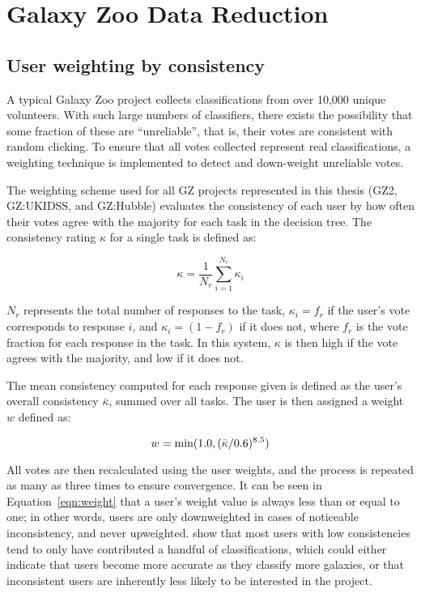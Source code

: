 \section{Galaxy Zoo Data Reduction}
\subsection{User weighting by consistency}
A typical Galaxy Zoo project collects classifications from over 10,000 unique volunteers. With such large numbers of classifiers, there exists the possibility that some fraction of these are ``unreliable'', that is, their votes are consistent with random clicking. To ensure that all votes collected represent real classifications, a weighting technique is implemented to detect and down-weight unreliable votes.

The weighting scheme used for all GZ projects represented in this thesis (GZ2, GZ:UKIDSS, and GZ:Hubble) evaluates the consistency of each user by how often their votes agree with the majority for each task in the decision tree. The consistency rating $\kappa$ for a single task is defined as:

\begin{equation}
\kappa = \frac{1}{N_{r}}\sum_{i=1}^{N_{r}}{\kappa_{i}}
\label{eqn:kappa}
\end{equation}

\noindent $N_{r}$ represents the total number of responses to the task, $\kappa_{i} = f_{r}$ if the user's vote corresponds to response $i$, and $\kappa_{i} = (1-f_{r})$ if it does not, where $f_{r}$ is the vote fraction for each response in the task. In this system, $\kappa$ is then high if the vote agrees with the majority, and low if it does not. 

The mean consistency computed for each response given is defined as the user's overall consistency $\bar{\kappa}$, summed over all tasks. The user is then assigned a weight $w$ defined as:

\begin{equation}
w = \rm min (1.0,(\bar{\kappa}/0.6)^{8.5})
\label{eqn:weight}
\end{equation}

All votes are then recalculated using the user weights, and the process is repeated as many as three times to ensure convergence. It can be seen in Equation~\ref{eqn:weight} that a user's weight value is always less than or equal to one; in other words, users are only downweighted in cases of noticeable inconsistency, and never upweighted. \citet{Willett2013} show that most users with low consistencies tend to only have contributed a handful of classifications, which could either indicate that users become more accurate as they classify more galaxies, or that inconsistent users are inherently less likely to be interested in the project. 

